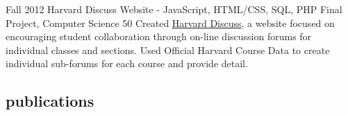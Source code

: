 \documentclass[]{friggeri-cv} %
\begin{document}
\begin{detailed}
\entry
{Fall 2012}
{Harvard Discuss Website - JavaScript, HTML/CSS, SQL, PHP}
{Final Project, Computer Science 50}
{Created \href{https://www.hcs.harvard.edu/~harvarddiscuss/index.php/en/}{Harvard Discuss}, a website focused on encouraging student collaboration through on-line discussion forums for individual classes and sections. Used Official Harvard Course Data to create individual sub-forums for each course and provide detail.}
\end{detailed}


\begin{pubs}
\section{publications}



\begin{refsection} %
\nocite{*}
\printbibliography[sorting=chronological, type=inproceedings, title={international peer-reviewed conferences/proceedings}, notkeyword={france}, heading=subbibliography]
\end{refsection}

\begin{refsection} %
\nocite{*}
\printbibliography[sorting=chronological, type=inproceedings, title={local peer-reviewed conferences/proceedings}, keyword={france}, heading=subbibliography]
\end{refsection}


\end{pubs}

\begin{transcript}

\end{transcript}

\end{document}
